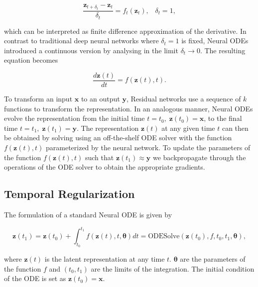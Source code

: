 \begin{equation}
	\frac{\mathbf{z}_{t+\delta_t}-\mathbf{z}_t}{ \delta_t } = f_t(\mathbf{z}_t) , \; \; \; \delta_t = 1,
	\label{eq:resnet}
\end{equation}

which can be interpreted as finite difference approximation of the derivative. In contrast to traditional deep neural networks where $\delta_t=1$ is fixed, Neural ODEs \cite{chen2018neural} introduced a continuous version by analysing  in the limit $\delta_t \rightarrow 0$. The resulting equation becomes 

\begin{equation}
	\frac{d\mathbf{z}(t)}{dt} = f(\mathbf{z}(t),t).
	\label{eq:neural_ode_def}
\end{equation}

To transform an input $\mathbf{x}$ to an output $\mathbf{y}$, Residual networks use a sequence of $k$ functions to transform the representation. In an analogous manner, Neural ODEs evolve the  representation from the initial time $t=t_0, \; \mathbf{z}(t_0)= \mathbf{x}$, to the final time $t=t_1, \; \mathbf{z}(t_1)= \mathbf{y}$. The representation $\mathbf{z}(t)$ at any given time $t$ can then be obtained by solving  using an off-the-shelf ODE solver with the function $f(\mathbf{z}(t),t)$ parameterized by the neural network. To update the parameters of the function $f(\mathbf{z}(t),t)$ such that $\mathbf{z}(t_1) \approx \mathbf{y}$ we backpropagate through the operations of the ODE solver to obtain the appropriate gradients.



\subsection{Temporal Regularization}
The formulation of a standard Neural ODE is given by

\begin{equation}
	\mathbf{z}(t_1)= \mathbf{z}(t_0) + \int_{t_0}^{t_1} f(\mathbf{z}(t) , t , \mathbf{\theta}) dt = \text{ODESolve}  (\mathbf{z}(t_0) , f , t_0, t_1 , \mathbf{\theta}  ),
	\label{eq:ode_formulation}
\end{equation}

where $\mathbf{z}(t)$ is the latent representation at any time $t$. $\mathbf{\theta}$ are the parameters of the function $f$ and $(t_0, t_1)$ are the limits of the integration. The initial condition of the ODE is set as $\mathbf{z}(t_0)=\mathbf{x}$. 


